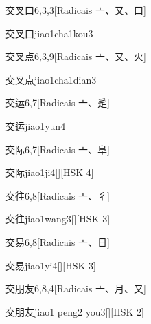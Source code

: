 \begin{entry}{交叉口}{6,3,3}[Radicais ⼇、⼜、⼝]
  \begin{phonetics}{交叉口}{jiao1cha1kou3}
  \end{phonetics}
\end{entry}

\begin{entry}{交叉点}{6,3,9}[Radicais ⼇、⼜、⽕]
  \begin{phonetics}{交叉点}{jiao1cha1dian3}
  \end{phonetics}
\end{entry}

\begin{entry}{交运}{6,7}[Radicais ⼇、⾡]
  \begin{phonetics}{交运}{jiao1yun4}
  \end{phonetics}
\end{entry}

\begin{entry}{交际}{6,7}[Radicais ⼇、⾩]
  \begin{phonetics}{交际}{jiao1ji4}[][HSK 4]
  \end{phonetics}
\end{entry}

\begin{entry}{交往}{6,8}[Radicais ⼇、⼻]
  \begin{phonetics}{交往}{jiao1wang3}[][HSK 3]
  \end{phonetics}
\end{entry}

\begin{entry}{交易}{6,8}[Radicais ⼇、⽇]
  \begin{phonetics}{交易}{jiao1yi4}[][HSK 3]
  \end{phonetics}
\end{entry}

\begin{entry}{交朋友}{6,8,4}[Radicais ⼇、⽉、⼜]
  \begin{phonetics}{交朋友}{jiao1 peng2 you3}[][HSK 2]
  \end{phonetics}
\end{entry}

